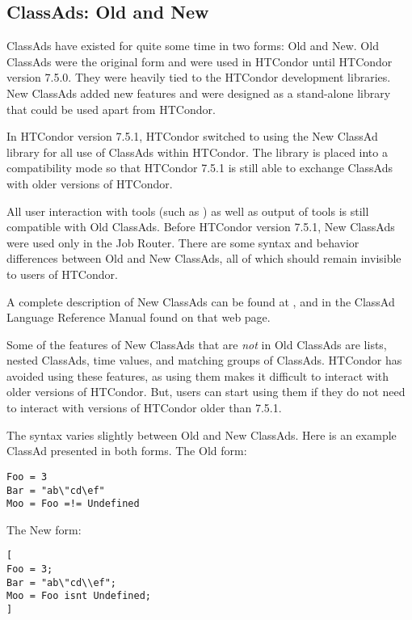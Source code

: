 \subsection{\label{sec:classad-newandold}
ClassAds: Old and New}

ClassAds have existed for quite some time in two forms:
Old and New.
Old ClassAds were the original form and were used in HTCondor
until HTCondor version 7.5.0.
They were heavily tied to the HTCondor development libraries.
New ClassAds added new features
and were designed as a stand-alone library that could be used apart
from HTCondor.

In HTCondor version 7.5.1, HTCondor switched to using the New ClassAd library
for all use of ClassAds within HTCondor. The library is
placed into a compatibility mode so that HTCondor 7.5.1 is still able to exchange ClassAds with
older versions of HTCondor.

All user interaction with tools (such as ) as well as
output of tools is still compatible with Old ClassAds.
Before HTCondor version 7.5.1, New ClassAds were used only in the Job Router.
There are some syntax and behavior differences between Old and New
 ClassAds, all of which should remain invisible to users of HTCondor.

A complete description of New ClassAds can be found at
,
and in the ClassAd Language Reference Manual found on that web page.

Some of the features of New ClassAds that are \emph{not} in Old ClassAds are
lists, nested ClassAds, time values, and matching groups of ClassAds.
HTCondor has avoided using these features,
as using them makes it difficult to interact with older versions of HTCondor.
But, users can start using them if they do not need to interact with
versions of HTCondor older than 7.5.1.

The syntax varies slightly between Old and New ClassAds.
Here is an example ClassAd presented in both forms.
The Old form:

\begin{verbatim}
Foo = 3
Bar = "ab\"cd\ef"
Moo = Foo =!= Undefined
\end{verbatim}

The New form:

\begin{verbatim}
[
Foo = 3;
Bar = "ab\"cd\\ef";
Moo = Foo isnt Undefined;
]
\end{verbatim}

